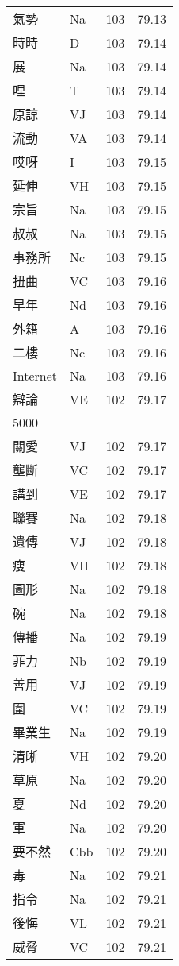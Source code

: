 \documentclass[twocolumn]{book}
\begin{document}
\begin{supertabular}{llrr}
氣勢 & Na & 103 &  79.13\\
時時 & D & 103 &  79.14\\
展 & Na & 103 &  79.14\\
哩 & T & 103 &  79.14\\
原諒 & VJ & 103 &  79.14\\
流動 & VA & 103 &  79.14\\
哎呀 & I & 103 &  79.15\\
延伸 & VH & 103 &  79.15\\
宗旨 & Na & 103 &  79.15\\
叔叔 & Na & 103 &  79.15\\
事務所 & Nc & 103 &  79.15\\
扭曲 & VC & 103 &  79.16\\
早年 & Nd & 103 &  79.16\\
外籍 & A & 103 &  79.16\\
二樓 & Nc & 103 &  79.16\\
Internet & Na & 103 &  79.16\\
辯論 & VE & 102 &  79.17\\
5000\\
關愛 & VJ & 102 &  79.17\\
壟斷 & VC & 102 &  79.17\\
講到 & VE & 102 &  79.17\\
聯賽 & Na & 102 &  79.18\\
遺傳 & VJ & 102 &  79.18\\
瘦 & VH & 102 &  79.18\\
圖形 & Na & 102 &  79.18\\
碗 & Na & 102 &  79.18\\
傳播 & Na & 102 &  79.19\\
菲力 & Nb & 102 &  79.19\\
善用 & VJ & 102 &  79.19\\
圍 & VC & 102 &  79.19\\
畢業生 & Na & 102 &  79.19\\
清晰 & VH & 102 &  79.20\\
草原 & Na & 102 &  79.20\\
夏 & Nd & 102 &  79.20\\
軍 & Na & 102 &  79.20\\
要不然 & Cbb & 102 &  79.20\\
毒 & Na & 102 &  79.21\\
指令 & Na & 102 &  79.21\\
後悔 & VL & 102 &  79.21\\
威脅 & VC & 102 &  79.21\\

\end{supertabular}
\end{document}
